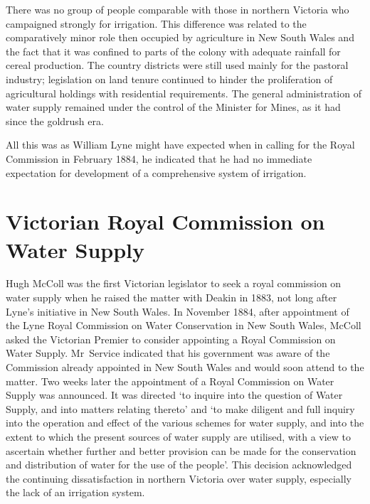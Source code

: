 There was no group of people comparable with those in northern
Victoria who campaigned strongly for irrigation.  This difference was
related to the comparatively minor role then occupied by agriculture
in New South Wales and the fact that it was confined to parts of the
colony with adequate rainfall for cereal production.  The country
districts were still used mainly for the pastoral industry;
legislation on land tenure continued to hinder the proliferation of
agricultural holdings with residential requirements.  The general
administration of water supply remained under the control of the
Minister for Mines, as it had since the goldrush era.

All this was as William Lyne   might have expected
when in calling for the Royal Commission in February 1884, he
indicated that he had no immediate expectation for development of a
comprehensive system of irrigation.

\section*{Victorian Royal Commission on Water Supply}

Hugh McColl  was the first Victorian legislator to
seek a royal commission on water supply when he raised the matter with
Deakin  in 1883, not long after Lyne's initiative in
New South Wales. In November 1884, after appointment of the Lyne Royal
Commission on Water Conservation in New South Wales, McColl asked the
Victorian Premier to consider appointing a Royal Commission on Water
Supply. Mr~Service indicated that his government was aware of the
Commission already appointed in New South Wales and would soon attend
to the matter.  Two weeks later the appointment of a Royal Commission
on Water Supply was announced. It was directed `to inquire into the
question of Water Supply, and into matters relating thereto' and `to
make diligent and full inquiry into the operation and effect of the
various schemes for water supply, and into the extent to which the
present sources of water supply are utilised, with a view to ascertain
whether further and better provision can be made for the conservation
and distribution of water for the use of the people'. This decision
acknowledged the continuing dissatisfaction in northern Victoria over
water supply, especially the lack of an irrigation system.

